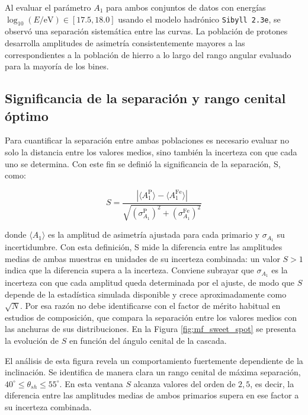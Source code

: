 Al evaluar el parámetro $A_1$ para ambos conjuntos de datos con energías $\log_{10}(E/\mathrm{eV}) \in [17.5, 18.0]$ usando el modelo hadrónico \texttt{Sibyll 2.3e}, se observó una separación sistemática entre las curvas. La población de protones desarrolla amplitudes de asimetría consistentemente mayores a las correspondientes a la población de hierro a lo largo del rango angular evaluado para la mayoría de los bines.

\subsection{Significancia de la separación y rango cenital óptimo}
\label{subsec:sweet_spot}

Para cuantificar la separación entre ambas poblaciones es necesario evaluar no solo la distancia entre los valores medios, sino también la incerteza con que cada uno se determina. Con este fin se definió la significancia de la separación, S, como:

\begin{equation}
	S = \frac{|\langle A_1^{\text{P}} \rangle - \langle A_1^{\text{Fe}} \rangle|}{\sqrt{(\sigma_{A_1}^{\text{P}})^2 + (\sigma_{A_1}^{\text{Fe}})^2}}
	\label{eq:merit_factor}
\end{equation}

donde $\langle A_1 \rangle$ es la amplitud de asimetría ajustada para cada primario y $\sigma_{A_1}$ su incertidumbre. Con esta definición, S mide la diferencia entre las amplitudes medias de ambas muestras en unidades de su incerteza combinada: un valor $S > 1$ indica que la diferencia supera a la incerteza. Conviene subrayar que $\sigma_{A_1}$ es la incerteza con que cada amplitud queda determinada por el ajuste, de modo que $S$ depende de la estadística simulada disponible y crece aproximadamente como $\sqrt{N}$. Por esa razón no debe identificarse con el factor de mérito habitual en estudios de composición, que compara la separación entre los valores medios con las anchuras de sus distribuciones. En la Figura \ref{fig:mf_sweet_spot} se presenta la evolución de $S$ en función del ángulo cenital de la cascada.

El análisis de esta figura revela un comportamiento fuertemente dependiente de la inclinación. Se identifica de manera clara un rango cenital de máxima separación, $40^\circ \leq \theta_{sh} \leq 55^\circ$. En esta ventana $S$ alcanza valores del orden de $2,5$, es decir, la diferencia entre las amplitudes medias de ambos primarios supera en ese factor a su incerteza combinada.

